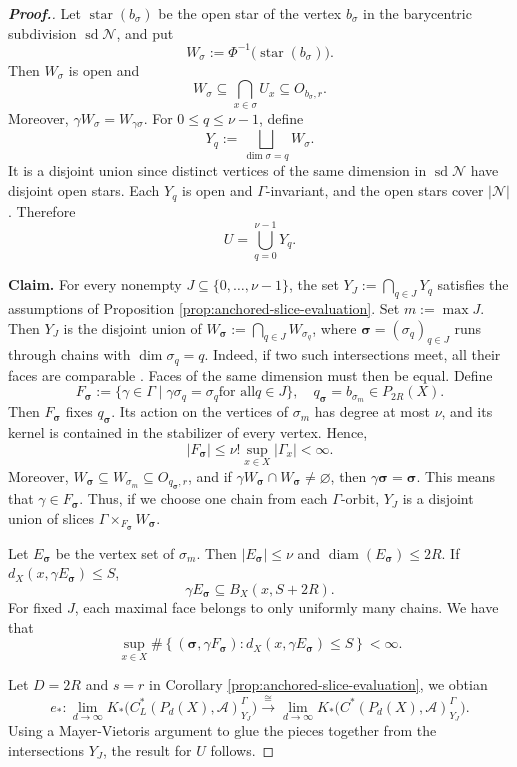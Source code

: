 \documentclass[pdflatex]{sn-jnl}
\theoremstyle{plain}
\theoremstyle{definition}
\begin{document}
\begin{proof}[\textbf{Proof.}]
Let $\operatorname{star}(b_\sigma)$ be the open star of the
vertex $b_\sigma$ in the barycentric subdivision
$\operatorname{sd}\mathcal N$, and put
\[W_{\sigma}:=\Phi^{-1}\bigl(\operatorname{star}(b_\sigma)\bigr).
\]
Then $W_{\sigma}$ is open and
\[W_\sigma\subseteq\bigcap_{x\in\sigma}U_x
\subseteq O_{b_\sigma,r}.
\]
Moreover,
$\gamma W_\sigma=W_{\gamma\sigma}$.
For $0\leq q\leq\nu-1$, define
\[Y_q:=\bigsqcup_{\dim\sigma=q}W_\sigma.\]
It is a disjoint union since distinct vertices of the same dimension in $\operatorname{sd}\mathcal N$ have disjoint open stars. Each $Y_q$ is open and
$\Gamma$-invariant, and the open stars cover $|\mathcal N|$.
Therefore
\[U=\bigcup_{q=0}^{\nu-1}Y_q.\]\par
\textbf{Claim.}
For every nonempty $J\subseteq\{0,\ldots,\nu-1\}$, the set
$Y_J:=\bigcap_{q\in J}Y_q$ satisfies the assumptions of
Proposition \ref{prop:anchored-slice-evaluation}.
Set $m:=\max J$. Then $Y_J$ is the disjoint union of
$W_{\boldsymbol\sigma}:=\bigcap_{q\in J}W_{\sigma_q}$, where
$\boldsymbol\sigma=(\sigma_q)_{q\in J}$ runs through chains with $\dim\sigma_q=q$. Indeed, if two such intersections meet, all their faces are comparable \cite{Mun84}. Faces of the same dimension must then be equal.
Define
\[F_{\boldsymbol\sigma}:=\{\gamma\in\Gamma\mid
\gamma\sigma_q=\sigma_q\text{for all}q\in J\},
\quad q_{\boldsymbol\sigma}=b_{\sigma_m}\in P_{2R}(X).
\]
Then $F_{\boldsymbol\sigma}$ fixes $q_{\boldsymbol\sigma}$.
Its action on the vertices of $\sigma_m$ has degree at most $\nu$,
and its kernel is contained in the stabilizer of every vertex. Hence,
\[|F_{\boldsymbol\sigma}|\leq\nu!\sup_{x\in X}|\Gamma_x|<\infty.
\]
Moreover,
$W_{\boldsymbol\sigma}\subseteq W_{\sigma_m}
\subseteq O_{q_{\boldsymbol\sigma},r}$, and
if $\gamma W_{\boldsymbol\sigma}\cap W_{\boldsymbol\sigma}\neq\varnothing$, then $\gamma\boldsymbol\sigma=\boldsymbol\sigma$. This means that $\gamma\in F_{\boldsymbol\sigma}$.
Thus, if we choose one chain from each $\Gamma$-orbit,
$Y_J$ is a disjoint union of slices
$\Gamma\times_{F_{\boldsymbol\sigma}}W_{\boldsymbol\sigma}$.

Let
$E_{\boldsymbol\sigma}$ be the vertex set of $\sigma_m$. Then
$|E_{\boldsymbol\sigma}|\leq\nu$ and
$\operatorname{diam}(E_{\boldsymbol\sigma})\leq2R$. If
$d_X(x,\gamma E_{\boldsymbol\sigma})\leq S$, 
$$\gamma E_{\boldsymbol\sigma}\subseteq B_X(x,S+2R).$$ For fixed $J$, each maximal face belongs to only
uniformly many chains. We have that
\[\sup_{x\in X}\#\left\{(\boldsymbol\sigma,\gamma F_{\boldsymbol\sigma}):
d_X(x,\gamma E_{\boldsymbol\sigma})\leq S
\right\}<\infty.\]

Let $D=2R$ and
$s=r$ in
Corollary \ref{prop:anchored-slice-evaluation}, we obtian
\[e_{*}:\lim_{d\to\infty}K_{*}\bigl(C_L^*(P_{d}(X),\mathcal{A})^\Gamma_{Y_J}\bigr)\xrightarrow{\cong}\lim_{d\to\infty}
K_{*}\bigl(C^*(P_{d}(X),\mathcal{A})^\Gamma_{Y_J}\bigr).\]
Using a Mayer-Vietoris argument to glue the pieces together from the intersections $Y_J$, the result for $U$ follows.
\end{proof}
\end{document}
